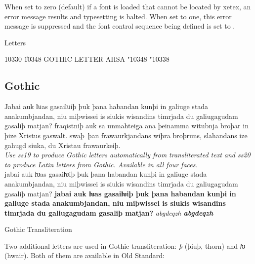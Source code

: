 \noindent When set to zero (default) if a font is loaded that cannot be
located by xetex, an error message results and typesetting is
halted. When set to one, this error message is
suppressed and the font control sequence being defined is set to
.

\begin{comment}
\begin{texexample}{supress errors}{err}
\end{texexample}
\end{comment}

Letters

10330 \U{10348} GOTHIC LETTER AHSA \char"10348 \char"10338\\

\thorn

\subsection*{Gothic}

Jabai auk ƕas gasaiƕiþ þuk þana habandan kunþi in galiuge stada
anakumbjandan, niu miþwissei is siukis wis\-an\-dins timrjada du
galiugagudam gasaliþ matjan?  fraqistniþ auk sa unmahteiga ana
þeinamma witubnja broþar in þize Xristus gaswalt.  swaþ~þan
frawaurkjandans wiþra broþruns, slahandans ize gahugd siuka, du
Xristau fra\-waur\-keiþ.\\

{\noindent\small\itshape Use ss19 to produce Gothic letters
  automatically from transliterated text and ss20 to produce Latin
  letters from Gothic. Available in all four faces.}\\[1ex]
{jabai auk ƕas gasaiƕiþ þuk þana
  habandan kunþi in ga\-liuge stada anakumbjandan, niu miþwissei is
  siukis wis\-an\-dins timrjada du galiugagudam gasaliþ matjan?
  {\bfseries jabai auk ƕas gasaiƕiþ þuk þana habandan kunþi in
    ga\-liuge stada anakumbjandan, niu miþwissei is siukis
    wis\-an\-dins timrjada du galiugagudam gasaliþ matjan?}
  \textit{abgdeqzh \bfseries abgdeqzh}}

Gothic Transliteration

Two additional letters are used in Gothic transliteration: \textit{þ}
(þiuþ, thorn) and \textit{ƕ} (hwair). Both of them are available in Old
Standard:

